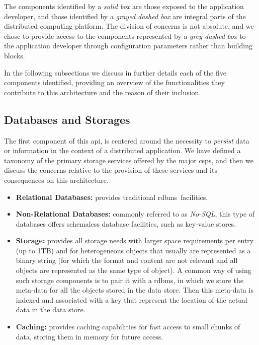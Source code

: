 \documentclass[12pt, titlepage]{uo_temp}
\begin{document}
     The components identified by a \emph{solid box} are those exposed to the application
     developer, and those identified by a \emph{grayed dashed box} are integral parts of
     the distributed computing platform. The division of concerns is not absolute, and we
     chose to provide access to the components represented by a \emph{grey dashed box} to
     the application developer through configuration parameters rather than building
     blocks.

     In the following subsections we discuss in further details each of the five
     components identified, providing an overview of the functionalities they contribute
     to this architecture and the reason of their inclusion.

     \subsection{Databases and Storages}
     The first component of this \gls{api}, is centered around the necessity to
     \emph{persist} data or information in the context of a distributed application. We
     have defined a taxonomy of the primary storage services offered by the major
     \gls{csp}s, and then we discuss the concerns relative to the provision of these
     services and its consequences on this architecture.

     \begin{itemize}
       \item \textbf{Relational Databases:} provides traditional \gls{rdbms}\ facilities.
       \item \textbf{Non-Relational Databases:} commonly referred to as \emph{No-SQL}, this
         type of databases offers schemaless database facilities, such as key-value stores.
       \item \textbf{Storage:} provides all storage needs with larger space requirements
         per entry (up to 1TB) and for heterogeneous objects that usually are represented
         as a binary string (for which the format and content are not relevant and all
         objects are represented as the same type of object). A common way of using such
         storage components is to pair it with a \gls{rdbms}, in which we store the
         meta-data for all the objects stored in the data store. Then this meta-data is
         indexed and associated with a key that represent the location of the actual data
         in the data store.
       \item \textbf{Caching:} provides caching capabilities for fast access to small
         chunks of data, storing them in memory for future access.
     \end{itemize}
\end{document}

